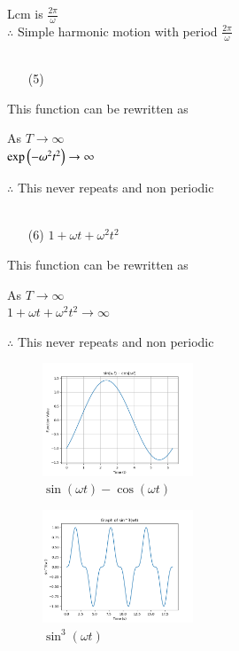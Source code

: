 \documentclass[journal,12pt,twocolumn]{IEEEtran}
\theoremstyle{remark}
\begin{document}
 Lcm is $\frac{2\pi}{\omega}$\\
 $\therefore$  Simple harmonic motion with period $\frac{2\pi}{\omega}$\\
 \\
 \begin{enumerate}
 \item[(5)]  \\
\end{enumerate}
This function can be rewritten as\\ 
       \begin{center}
     As $T\to\infty$\\
    $\text{exp}\left(-\omega^2 t^2\right)\to \infty$\\ 
       \end{center}
    $\therefore$  This never repeats and non periodic\\
    \\
    \begin{enumerate}
 \item[(6)] $1+\omega t+\omega^2t^2$\\
\end{enumerate}
This function can be rewritten as\\ 
 \begin{center}
  As $T\to\infty$\\
  $1+\omega t+\omega^2t^2  \to \infty$\\
  \end{center}
  $\therefore$ This never repeats and non periodic\\ 
 

 \renewcommand{\thefigure}{\theenumi}
 \renewcommand{\thetable}{\theenumi}
 
 
 \begin{figure}[h!]
    \centering
    \includegraphics[width=0.4\textwidth]{figs/a1_fig1.png}
    \caption{$\sin(\omega t)- \cos(\omega t)$}
\end{figure}
 \begin{figure}[h!]
    \centering
    \includegraphics[width=0.4\textwidth]{figs/a1_fig2.png}
    \caption{$\sin^3(\omega t)$}
\end{figure}
 \newpage
 
\end{document}
